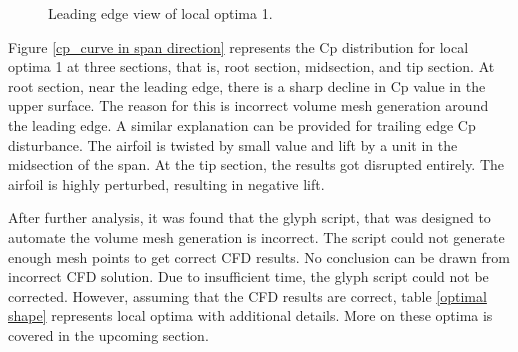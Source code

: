 \begin{figure}[!htbp]
    \centering
    \caption{Leading edge view of local optima 1.}
    \label{frontview_localoptima_1}
\end{figure}


Figure \ref{cp_curve in span direction} represents the Cp distribution for local optima 1 at three sections, that is, root section, midsection, and tip section. At root section, near the leading edge, there is a sharp decline in Cp value in the upper surface. The reason for this is incorrect volume mesh generation around the leading edge. A similar explanation can be provided for trailing edge Cp disturbance. The airfoil is twisted by small value and lift by a unit in the midsection of the span. At the tip section, the results got disrupted entirely. The airfoil is highly perturbed, resulting in negative lift.

After further analysis, it was found that the glyph script, that was designed to automate the volume mesh generation is incorrect. The script could not generate enough mesh points to get correct CFD results. No conclusion can be drawn from incorrect CFD solution. Due to insufficient time, the glyph script could not be corrected. However, assuming that the CFD results are correct, table \ref{optimal shape} represents local optima with additional details. More on these optima is covered in the upcoming section.

